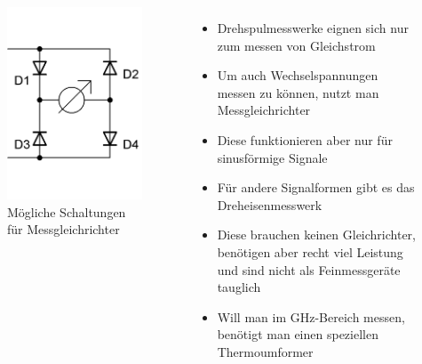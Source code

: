 \begin{frame}
\begin{columns}
\begin{center}
\begin{figure}
        \includegraphics[width=\textwidth,height=.4\textheight,keepaspectratio]{a16/Messgleichrichter2.png}
        \caption{Mögliche Schaltungen für Messgleichrichter}
      \end{figure}
    \end{center}
    \begin{itemize}
      \item Drehspulmesswerke eignen sich nur zum messen von Gleichstrom
      \item Um auch Wechselspannungen messen zu können, nutzt man Messgleichrichter
      \item Diese funktionieren aber nur für sinusförmige Signale
      \item Für andere Signalformen gibt es das Dreheisenmesswerk
      \item Diese brauchen keinen Gleichrichter, benötigen aber recht viel Leistung und sind nicht als Feinmessgeräte tauglich
      \item Will man im GHz-Bereich messen, benötigt man einen speziellen Thermoumformer
    \end{itemize}
  \end{columns}
\end{frame}

